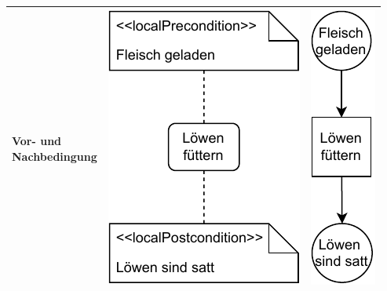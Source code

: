 \begin{longtable}{p{\sttpHilfA}|c|c}
			\parbox{\sttpHilfA}{\centering
				Vor- und \\ Nachbedingung} 
		& 
			\parbox{\sttpHilfB}{\centering
				\vspace{\sttpAbstandRand}
				\includegraphics[scale=\sttpFaktor]{Bilder/Kapitel-5/gegenueberstellung_2a.pdf}
				\vspace{\sttpAbstandRand}
			} 
		&
			\parbox{\sttpHilfB}{\centering
				\vspace{\sttpAbstandRand}
				\includegraphics[scale=\sttpFaktor]{Bilder/Kapitel-5/gegenueberstellung_2b.pdf}
				\vspace{\sttpAbstandRand}
			} 
		\\
	
		\hline %
	

\end{longtable}
